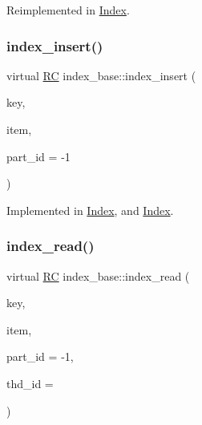 Reimplemented in \hyperlink{classIndex_ad70e606faaf0a67b690275b8f8ca5d5f}{Index}.

\mbox{\label{classindex__base_a819b2cb7cbc7c740381e64d4c9023745}} 
\subsubsection{\texorpdfstring{index\+\_\+insert()}{index\_insert()}}
{\footnotesize\ttfamily virtual \hyperlink{global_8h_a78c49a674c810fdd03d20432f7be864a}{RC} index\+\_\+base\+::index\+\_\+insert (\begin{DoxyParamCaption}\item[{\hyperlink{index__base_8h_ae35c40bc2f912c11f0e36ac66cba4489}{K\+E\+Y\+\_\+\+T\+Y\+PE}}]{key,  }\item[{\hyperlink{microbench_2main_8cpp_ae17cb099b4c9aee7835032339b5a9e0d}{V\+A\+L\+U\+E\+\_\+\+T\+Y\+PE}}]{item,  }\item[{int}]{part\+\_\+id = {\ttfamily -\/1} }\end{DoxyParamCaption})\hspace{0.3cm}{\ttfamily [pure virtual]}}



Implemented in \hyperlink{classIndex_a2266050deae0c62e0b90e7d60fd70f35}{Index}, and \hyperlink{classIndex_a03544bdceed7feb756712086fb239de1}{Index}.

\mbox{\label{classindex__base_ae63072105f55821091506f1a6557dd1c}} 
\subsubsection{\texorpdfstring{index\+\_\+read()}{index\_read()}\hspace{0.1cm}{\footnotesize\ttfamily [1/3]}}
{\footnotesize\ttfamily virtual \hyperlink{global_8h_a78c49a674c810fdd03d20432f7be864a}{RC} index\+\_\+base\+::index\+\_\+read (\begin{DoxyParamCaption}\item[{\hyperlink{index__base_8h_ae35c40bc2f912c11f0e36ac66cba4489}{K\+E\+Y\+\_\+\+T\+Y\+PE}}]{key,  }\item[{\hyperlink{microbench_2main_8cpp_ae17cb099b4c9aee7835032339b5a9e0d}{V\+A\+L\+U\+E\+\_\+\+T\+Y\+PE} $\ast$}]{item,  }\item[{int}]{part\+\_\+id = {\ttfamily -\/1},  }\item[{int}]{thd\+\_\+id = {} }\end{DoxyParamCaption})\hspace{0.3cm}{\ttfamily [pure virtual]}}



